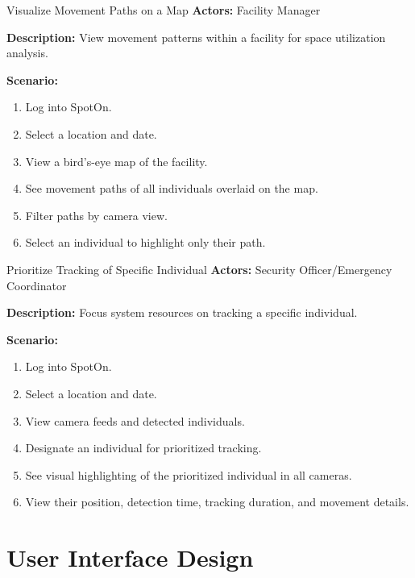\begin{usecase}{Visualize Movement Paths on a Map}
    \textbf{Actors:} Facility Manager

    \textbf{Description:} View movement patterns within a facility for space utilization analysis.

    \textbf{Scenario:}
    \begin{enumerate}[leftmargin=80pt]
        \item Log into SpotOn.
        \item Select a location and date.
        \item View a bird's-eye map of the facility.
        \item See movement paths of all individuals overlaid on the map.
        \item Filter paths by camera view.
        \item Select an individual to highlight only their path.
    \end{enumerate}
\end{usecase}

\begin{usecase}{Prioritize Tracking of Specific Individual}
    \textbf{Actors:} Security Officer/Emergency Coordinator

    \textbf{Description:} Focus system resources on tracking a specific individual.

    \textbf{Scenario:}
    \begin{enumerate}[leftmargin=80pt]
        \item Log into SpotOn.
        \item Select a location and date.
        \item View camera feeds and detected individuals.
        \item Designate an individual for prioritized tracking.
        \item See visual highlighting of the prioritized individual in all cameras.
        \item View their position, detection time, tracking duration, and movement details.
    \end{enumerate}
\end{usecase}


\section{User Interface Design}
\label{section:user-interface-design}

